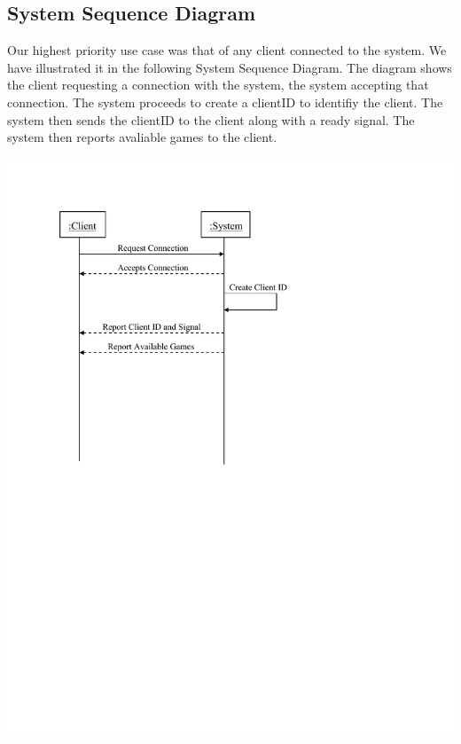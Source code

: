 \documentclass[letterpaper,12pt]{article}
\begin{document}
\subsection{System Sequence Diagram}
Our highest priority use case was that of any client connected to the system. We have illustrated it in the following System Sequence Diagram. The diagram shows the client requesting a connection with the system, the system accepting that connection. The system proceeds to create a clientID to identifiy the client. The system then sends the clientID to the client along with a ready signal. The system then reports avaliable games to the client. 
\begin{center} \includegraphics{SSD.pdf} \end{center} 
\end{document}
